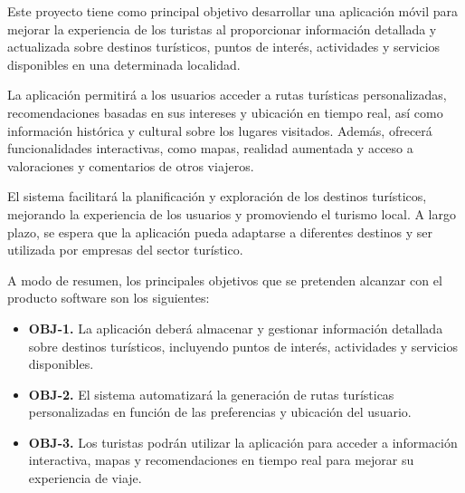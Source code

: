 

Este proyecto tiene como principal objetivo desarrollar una aplicación móvil
para mejorar la experiencia de los turistas al proporcionar información
detallada y actualizada sobre destinos turísticos, puntos de interés,
actividades y servicios disponibles en una determinada localidad.

La aplicación permitirá a los usuarios acceder a rutas turísticas
personalizadas, recomendaciones basadas en sus intereses y ubicación en tiempo
real, así como información histórica y cultural sobre los lugares visitados.
Además, ofrecerá funcionalidades interactivas, como mapas, realidad aumentada y
acceso a valoraciones y comentarios de otros viajeros.

El sistema facilitará la planificación y exploración de los destinos turísticos,
mejorando la experiencia de los usuarios y promoviendo el turismo local. A
largo plazo, se espera que la aplicación pueda adaptarse a diferentes destinos y
ser utilizada por empresas del sector turístico.

A modo de resumen, los principales objetivos que se pretenden alcanzar con el
producto software son los siguientes:

\begin{itemize} \item \textbf{OBJ-1.} La aplicación deberá almacenar y
gestionar información detallada sobre destinos turísticos, incluyendo puntos de
interés, actividades y servicios disponibles. \item \textbf{OBJ-2.} El sistema
automatizará la generación de rutas turísticas personalizadas en función de las
preferencias y ubicación del usuario. \item \textbf{OBJ-3.} Los turistas podrán
utilizar la aplicación para acceder a información interactiva, mapas y
recomendaciones en tiempo real para mejorar su experiencia de viaje.
\end{itemize}